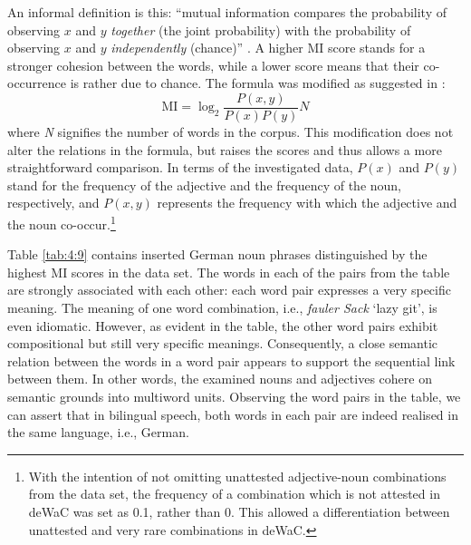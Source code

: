 \noindent An informal definition is this: ``mutual information compares the probability of observing $x$ and $y$ \textit{together} (the joint probability) with the probability of observing $x$ and $y$ \textit{independently} (chance)'' \citep[23]{church-hanks-1990}. A higher MI score stands for a stronger cohesion between the words, while a lower score means that their co-occurrence is rather due to chance. The formula was modified as suggested in \citet{wiechmann-2008}: \[  \text{MI} = \log_2 \frac{P(x,y)}{P(x)P(y)}N \]  where \textit{N} signifies the number of words in the corpus. This modification does not alter the relations in the formula, but raises the scores and thus allows a more straightforward comparison. In terms of the investigated data, $P(x)$ and $P(y)$ stand for the frequency of the adjective and the frequency of the noun, respectively, and $P(x,y)$ represents the frequency with which the adjective and the noun co-occur.\footnote{With the intention of not omitting unattested adjective-noun combinations from the data set, the frequency of a combination which is not attested in deWaC was set as 0.1, rather than 0. This allowed a differentiation between unattested and very rare combinations in deWaC.}

Table \ref{tab:4:9} contains inserted German noun phrases distinguished by the highest MI scores in the data set. The words in each of the pairs from the table are strongly associated with each other: each word pair expresses a very specific meaning. The meaning of one word combination, i.e., \textit{fauler Sack} `lazy git', is even idiomatic. However, as evident in the table, the other word pairs exhibit compositional but still very specific meanings. Consequently, a close semantic relation between the words in a word pair appears to support the sequential link between them. In other words, the examined nouns and adjectives cohere on semantic grounds into multiword units. Observing the word pairs in the table, we can assert that in bilingual speech, both words in each pair are indeed realised in the same language, i.e., German.

